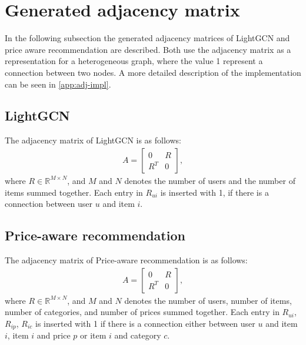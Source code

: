 \section{Generated adjacency matrix}
In the following subsection the generated adjacency matrices of LightGCN and price aware recommendation are described.
Both use the adjacency matrix as a representation for a heterogeneous graph, where the value 1 represent a connection between two nodes.
A more detailed description of the implementation can be seen in \ref{app:adj-impl}.

\subsection{LightGCN}
The adjacency matrix of LightGCN is as follows:
\begin{gather}
    A =
    \begin{bmatrix}
        0   & R \\
        R^T & 0
    \end{bmatrix},
\end{gather}
where $R \in \mathbb{R}^{M \times N}$, and $M$ and $N$ denotes the number of users and the number of items summed together.
Each entry in $R_{ui}$ is inserted with 1, if there is a connection between user $u$ and item $i$.

\subsection{Price-aware recommendation}
The adjacency matrix of Price-aware recommendation is as follows:
\begin{gather}
    A =
    \begin{bmatrix}
        0   & R \\
        R^T & 0
    \end{bmatrix},
\end{gather}
where $R \in \mathbb{R}^{M \times N}$, and $M$ and $N$ denotes the number of users, number of items, number of categories, and number of prices summed together.
Each entry in $R_{ui}$, $R_{ip}$, $R_{ic}$ is inserted with 1 if there is a connection either between user $u$ and item $i$, item $i$ and price $p$ or item $i$ and category $c$.
